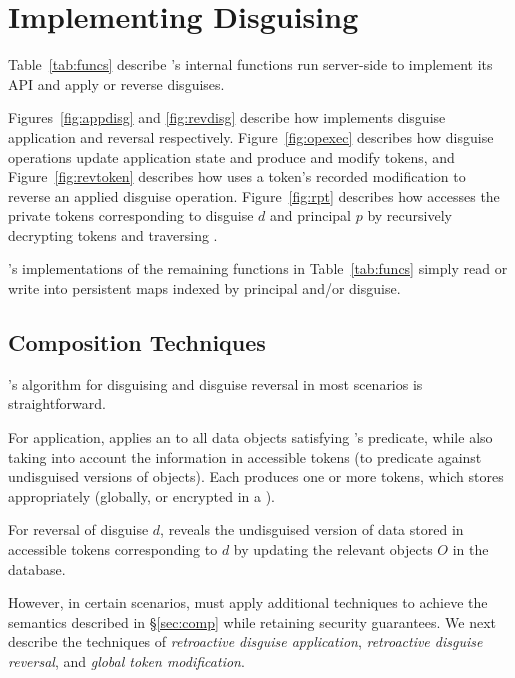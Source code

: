 \section{Implementing Disguising}
Table~\ref{tab:funcs} describe \sys's internal functions run server-side to implement its API 
and apply or reverse disguises. 

Figures~\ref{fig:appdisg} and \ref{fig:revdisg} describe how \sys implements disguise application and
reversal respectively. Figure~\ref{fig:opexec} describes how disguise operations update application
state and produce and modify tokens, and 
Figure~\ref{fig:revtoken} describes how \sys uses a token's recorded
modification to reverse an applied disguise operation. 
Figure~\ref{fig:rpt} describes how \sys accesses the private tokens
corresponding to disguise $d$ and principal $p$ by recursively decrypting tokens and traversing
.

\sys's implementations of the remaining functions in Table~\ref{tab:funcs} simply read or write into
persistent maps indexed by principal and/or disguise.

\subsection{Composition Techniques}
\sys's algorithm for disguising and disguise reversal in most scenarios is straightforward. 

For application, \sys applies an  to all
data objects satisfying 's predicate, while also taking into account the information in
accessible tokens (to \eg predicate against undisguised versions of objects). Each  produces
one or more tokens, which \sys stores appropriately (globally, or encrypted in a ).

For reversal of disguise $d$, \sys reveals the undisguised version of data stored in accessible tokens
corresponding to $d$ by updating the relevant objects $O$ in the database.

However, in certain scenarios, \sys must apply additional techniques to achieve the semantics
described in \S\ref{sec:comp} while retaining security guarantees. We next describe the techniques
of \emph{retroactive disguise application}, \emph{retroactive disguise reversal}, and \emph{global
token modification}.

